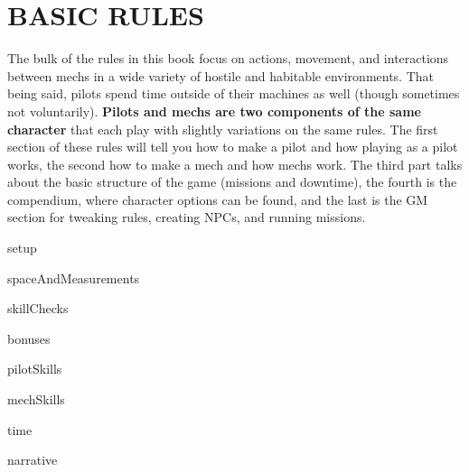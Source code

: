 \chapter{BASIC RULES}

The bulk of the rules in this book focus on actions, movement, and interactions between mechs
in a wide variety of hostile and habitable environments. That being said, pilots spend time
outside of their machines as well (though sometimes not voluntarily). \textbf{Pilots and mechs are two
components of the same character} that each play with slightly variations on the same rules.
The first section of these rules will tell you how to make a pilot and how playing as a pilot works,
the second how to make a mech and how mechs work. The third part talks about the basic
structure of the game (missions and downtime), the fourth is the compendium, where character
options can be found, and the last is the GM section for tweaking rules, creating NPCs, and
running missions.

{setup}

{spaceAndMeasurements}

{skillChecks}

{bonuses}

{pilotSkills}

{mechSkills}

{time}

{narrative}


